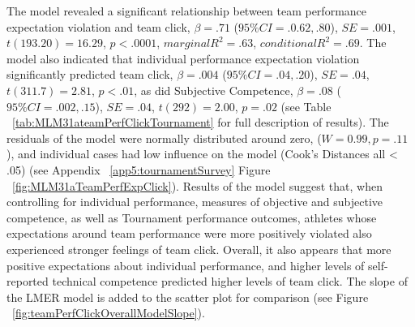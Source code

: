      \bigskip

The model revealed a significant relationship between team performance expectation violation and team click, $\beta = .71$ ($95\% CI =  .0.62, .80$), $SE = .001$, $t(193.20) = 16.29$, $p < .0001$, $marginal R^2 = .63$, $conditional R^2 = .69$.
The model also indicated that individual performance expectation violation significantly predicted team click, $\beta = .004$ ($95\% CI =  .04, .20$), $SE = .04$, $t(311.7) = 2.81$, $p < .01$, as did Subjective Competence, $\beta = .08$ ($95\% CI =  .002, .15$), $SE = .04$, $t(292) = 2.00$, $p = .02$  (see Table ~\ref{tab:MLM31ateamPerfClickTournament} for full description of results).
The residuals of the model were normally distributed around zero, ($W = 0.99, p = .11$), and individual cases had low influence on the model (Cook's Distances all < .05) (see Appendix ~\ref{app5:tournamentSurvey} Figure ~\ref{fig:MLM31aTeamPerfExpClick}).
Results of the model suggest that, when controlling for individual performance, measures of objective and subjective competence, as well as Tournament performance outcomes, athletes whose expectations around team performance were more positively violated also experienced stronger feelings of team click. Overall, it also appears that more positive expectations about individual performance, and higher levels of self-reported technical competence predicted higher levels of team click.  The slope of the LMER model is added to the scatter plot for comparison (see Figure ~\ref{fig:teamPerfClickOverallModelSlope}).

   


